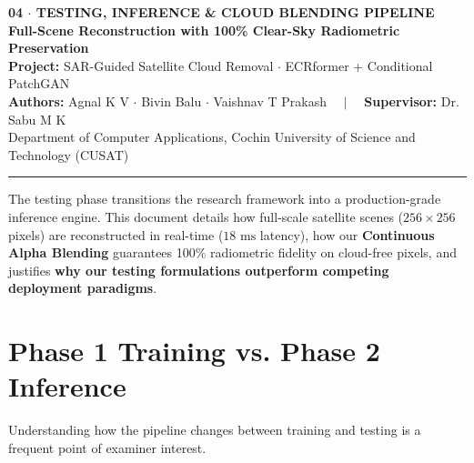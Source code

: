 \documentclass[11pt,a4paper]{article}
\begin{document}
\begin{center}
    {\LARGE \textbf{\textcolor{primary}{04 $\cdot$ TESTING, INFERENCE \& CLOUD BLENDING PIPELINE}}}\\[0.4em]
    {\large \textbf{Full-Scene Reconstruction with 100\% Clear-Sky Radiometric Preservation}}\\[0.6em]
    {\small \textbf{Project:} SAR-Guided Satellite Cloud Removal $\cdot$ ECRformer + Conditional PatchGAN}\\
    {\small \textbf{Authors:} Agnal K V $\cdot$ Bivin Balu $\cdot$ Vaishnav T Prakash $\quad|\quad$ \textbf{Supervisor:} Dr. Sabu M K}\\
    {\small Department of Computer Applications, Cochin University of Science and Technology (CUSAT)}
\end{center}
\vspace{-0.5em}
\noindent\rule{\linewidth}{1.2pt}

\vspace{0.8em}
\begin{tcolorbox}[colback=primary!5!white,colframe=primary,title=\textbf{Document Purpose \& Deployment Overview},fonttitle=\bfseries]
The testing phase transitions the research framework into a production-grade inference engine. This document details how full-scale satellite scenes ($256 \times 256$ pixels) are reconstructed in real-time ($18\text{ ms}$ latency), how our \textbf{Continuous Alpha Blending} guarantees 100\% radiometric fidelity on cloud-free pixels, and justifies \textbf{why our testing formulations outperform competing deployment paradigms}.
\end{tcolorbox}

\section{Phase 1 Training vs. Phase 2 Inference}

Understanding how the pipeline changes between training and testing is a frequent point of examiner interest.
\end{document}
